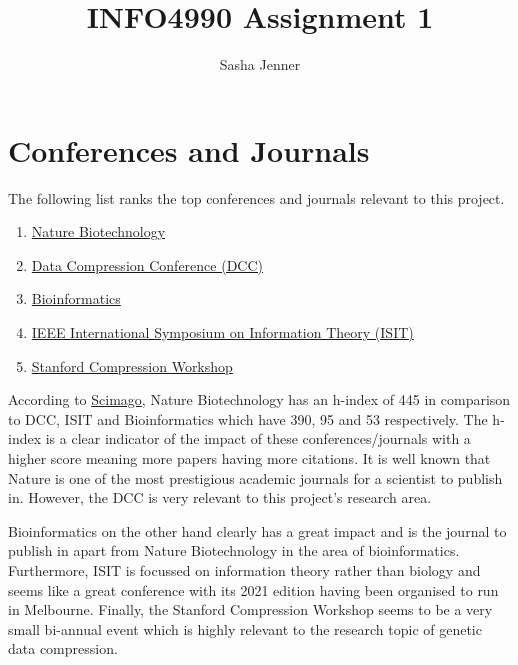 \documentclass[a4paper, 12pt]{article}
\begin{document}
\title{INFO4990 Assignment 1}
\author{Sasha Jenner}
\maketitle
\tableofcontents

\section{Conferences and Journals}
The following list ranks the top conferences and journals relevant to this project.
\begin{enumerate}
	\item \href{https://www.nature.com/nbt/}{Nature Biotechnology}
	\item \href{https://www.cs.brandeis.edu/~dcc/}{Data Compression Conference (DCC)}
	\item \href{https://academic.oup.com/bioinformatics/}{Bioinformatics}
	\item \href{https://www.isit2022.org/}{IEEE International Symposium on Information Theory (ISIT)}
	\item \href{https://compression.stanford.edu/stanford-compression-workshop-2021}{Stanford Compression Workshop}
\end{enumerate}

According to \href{https://www.scimagojr.com/}{Scimago}, Nature Biotechnology has an h-index of 445 in comparison to DCC, ISIT and Bioinformatics which have 390, 95 and 53 respectively. The h-index is a clear indicator of the impact of these conferences/journals with a higher score meaning more papers having more citations. It is well known that Nature is one of the most prestigious academic journals for a scientist to publish in. However, the DCC is very relevant to this project's research area.

Bioinformatics on the other hand clearly has a great impact and is the journal to publish in apart from Nature Biotechnology in the area of bioinformatics. Furthermore, ISIT is focussed on information theory rather than biology and seems like a great conference with its 2021 edition having been organised to run in Melbourne. Finally, the Stanford Compression Workshop seems to be a very small bi-annual event which is highly relevant to the research topic of genetic data compression.
\end{document}
